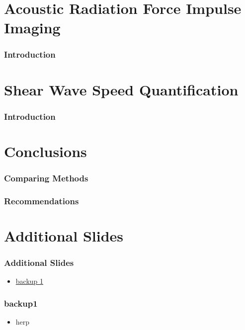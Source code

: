 \documentclass{beamer}
\begin{document}
	\section[ARFI]{Acoustic Radiation Force Impulse Imaging}
		\begin{frame}
			\frametitle{Introduction}
		\end{frame}

	\section[Shear]{Shear Wave Speed Quantification}
		\begin{frame}
			\frametitle{Introduction}
		\end{frame}

	\section{Conclusions}
		\begin{frame}
			\frametitle{Comparing Methods}
		\end{frame}
		\begin{frame}
			\frametitle{Recommendations}
		\end{frame}

	\appendix
	\section{Additional Slides}
	\setcounter{showProgressBar}{0}
	\setcounter{showSlideNumbers}{0}

		\begin{frame}
			\frametitle{Additional Slides}
			\begin{itemize}
				\item \hyperlink{backup1}{backup 1}
			\end{itemize}
		\end{frame}

		\begin{frame}[label=backup1]
			\frametitle{backup1}
			\begin{itemize}
				\item herp
			\end{itemize}
		\end{frame}
\end{document}
